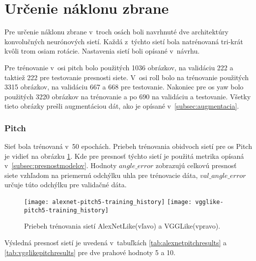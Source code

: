 
\section{Určenie náklonu zbrane}
Pre určenie náklonu zbrane v~troch osách boli navrhnuté dve architektúry konvolučných neurónových sietí.
Každá z~týchto sietí bola natrénovaná tri-krát kvôli trom osiam rotácie.
Nastavenia sietí boli opísané v~návrhu.

Pre trénovanie v~osi pitch bolo použitých 1036 obrázkov, na validáciu 222 a taktiež 222 pre testovanie presnosti siete.
V~osi roll bolo na trénovanie použitých 3315 obrázkov, na validáciu 667 a 668 pre testovanie.
Nakoniec pre os yaw bolo použitých 3220 obrázkov na trénovanie a po 690 na validáciu a testovanie.
Všetky tieto obrázky prešli augmentáciou dát, ako je opísané v~\ref{subsec:augmentacia}.

\subsubsection{Pitch}
Sieť bola trénovaná v~50 epochách.
Priebeh trénovania obidvoch sietí pre os Pitch je vidieť na obrázku \ref{pic:pitchaxis}.
Kde pre presnosť týchto sietí je použitá metrika opísaná v~\ref{subsec:presnostmodelov}.
Hodnoty $angle\_error$ zobrazujú celkovú presnosť siete vzhľadom na priemernú odchýlku uhla pre trénovacie dáta,
    $val\_angle\_error$ určuje túto odchýlku pre validačné dáta.

\begin{figure}[H]
    \centering
    \texttt{[image: alexnet-pitch5-training\_history]}
	\texttt{[image: vgglike-pitch5-training\_history]}
	\caption{Priebeh trénovania sietí AlexNetLike(vľavo) a VGGLike(vpravo).}
	\label{pic:pitchaxis}
\end{figure}

Výsledná presnosť sietí je uvedená v~tabuľkách \ref{tab:alexnetpitchresults} a \ref{tab:vgglikepitchresults} pre dve prahové hodnoty 5 a 10.

